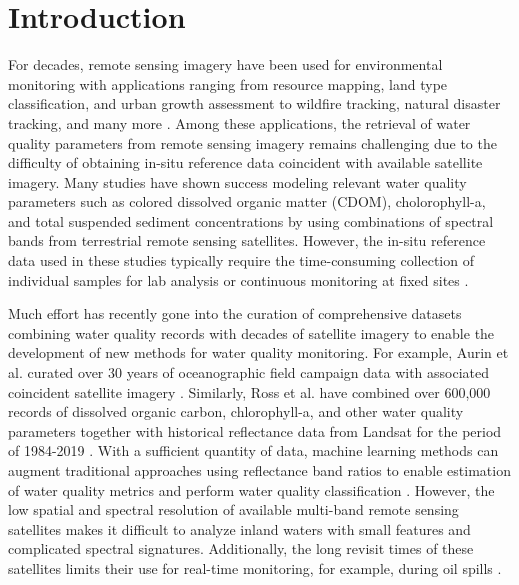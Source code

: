 \documentclass[sensors,article,submit,pdftex,moreauthors]{Definitions/mdpi}
\begin{document}
\section{Introduction}

For decades, remote sensing imagery have been used for environmental monitoring with applications ranging from resource mapping, land type classification, and urban growth assessment to wildfire tracking, natural disaster tracking, and many more \cite{cohen2004landsat, melesse2007remote, allison2016airborne, joyce2009review, robert2017analysis}. Among these applications, the retrieval of water quality parameters from remote sensing imagery remains challenging due to the difficulty of obtaining in-situ reference data coincident with available satellite imagery. Many studies have shown success modeling relevant water quality parameters such as colored dissolved organic matter (CDOM), cholorophyll-a, and total suspended sediment concentrations by using combinations of spectral bands from terrestrial remote sensing satellites. However, the in-situ reference data used in these studies typically require the time-consuming collection of individual samples for lab analysis or continuous monitoring at fixed sites \cite{brezonik2005landsat, paavel2011optical, gursoy2019investigating, bonansea2019using, sagan2020monitoring, remote-sensing-finland}. 

Much effort has recently gone into the curation of comprehensive datasets combining water quality records with decades of satellite imagery to enable the development of new methods for water quality monitoring. For example, Aurin et al. curated over 30 years of oceanographic field campaign data with associated coincident satellite imagery \cite{aurin2018remote}. Similarly, Ross et al. have combined over 600,000 records of dissolved organic carbon, chlorophyll-a, and other water quality parameters together with historical reflectance data from Landsat for the period of 1984-2019 \cite{ross2019aquasat}. With a sufficient quantity of data, machine learning methods can augment traditional approaches using reflectance band ratios to enable estimation of water quality metrics and perform water quality classification \cite{schiller1999neural, brown2008neural, lary2010artificial, feng2015urban,belgiu2016random}. However, the low spatial and spectral resolution of available multi-band remote sensing satellites makes it difficult to analyze inland waters with small features and complicated spectral signatures. Additionally, the long revisit times of these satellites limits their use for real-time monitoring, for example, during oil spills \cite{fingas2017review}.
\end{document}
